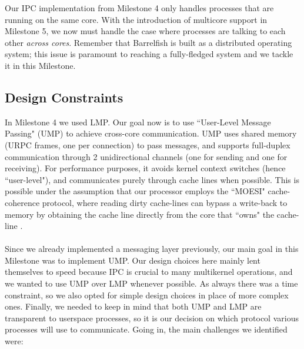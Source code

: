 Our IPC implementation from Milestone 4 only handles processes that are running on the same core. With the introduction of multicore support in Milestone 5, we now must handle the case where processes are talking to each other \textit{across cores}. Remember that Barrelfish is built as a distributed operating system; this issue is paramount to reaching a fully-fledged system and we tackle it in this Milestone.

\subsection{Design Constraints}
In Milestone 4 we used LMP. Our goal now is to use ``User-Level Message Passing" (UMP) to achieve cross-core communication. UMP uses shared memory (URPC frames, one per connection) to pass messages, and supports full-duplex communication through 2 unidirectional channels (one for sending and one for receiving). For performance purposes, it avoids kernel context switches (hence ``user-level"), and communicates purely through cache lines when possible. This is possible under the assumption that our processor employs the ``MOESI" cache-coherence protocol, where reading dirty cache-lines can bypass a write-back to memory by obtaining the cache line directly from the core that ``owns" the cache-line \cite{armman}.
\\\\
Since we already implemented a messaging layer previously, our main goal in this Milestone was to implement UMP. Our design choices here mainly lent themselves to speed because IPC is crucial to many multikernel operations, and we wanted to use UMP over LMP whenever possible. As always there was a time constraint, so we also opted for simple design choices in place of more complex ones. Finally, we needed to keep in mind that both UMP and LMP are transparent to userspace processes, so it is our decision on which protocol various processes will use to communicate. Going in, the main challenges we identified were:
